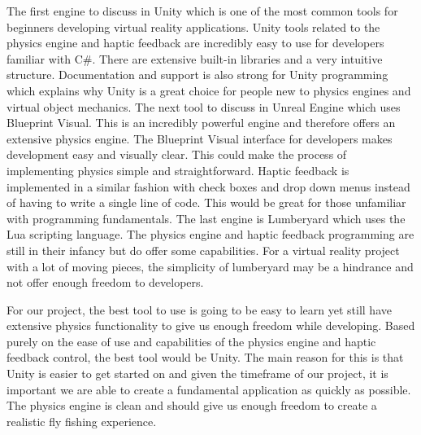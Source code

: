 \documentclass[10pt,journal,compsoc,onecolumn, draftclsnofoot]{IEEEtran}
\begin{document}
\begin{bibunit}
The first engine to discuss in Unity which is one of the most common tools for beginners developing virtual reality applications.
Unity tools related to the physics engine and haptic feedback are incredibly easy to use for developers familiar with C\#.
There are extensive built-in libraries and a very intuitive structure\cite{unity_getting_started}.
Documentation and support is also strong for Unity programming which explains why Unity is a great choice for people new to physics engines and virtual object mechanics.
The next tool to discuss in Unreal Engine which uses Blueprint Visual.
This is an incredibly powerful engine and therefore offers an extensive physics engine\cite{unreal_editor_manual}.
The Blueprint Visual interface for developers makes development easy and visually clear.
This could make the process of implementing physics simple and straightforward.
Haptic feedback is implemented in a similar fashion with check boxes and drop down menus instead of having to write a single line of code.
This would be great for those unfamiliar with programming fundamentals.
The last engine is Lumberyard which uses the Lua scripting language.
The physics engine and haptic feedback programming are still in their infancy but do offer some capabilities\cite{lumberyard_object_system}.
For a virtual reality project with a lot of moving pieces, the simplicity of lumberyard may be a hindrance and not offer enough freedom to developers.

For our project, the best tool to use is going to be easy to learn yet still have extensive physics functionality to give us enough freedom while developing.
Based purely on the ease of use and capabilities of the physics engine and haptic feedback control, the best tool would be Unity.
The main reason for this is that Unity is easier to get started on and given the timeframe of our project, it is important we are able to create a fundamental application as quickly as possible.
The physics engine is clean and should give us enough freedom to create a realistic fly fishing experience.
\vspace{2mm}


\end{bibunit}
\end{document}
